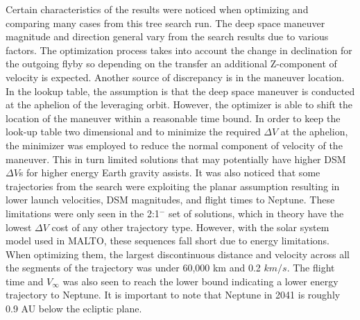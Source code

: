 \documentclass[letterpaper, paper,11pt]{./AAS}		%
\begin{document}
Certain characteristics of the results were noticed when optimizing and comparing many cases from this tree search run. The deep space maneuver magnitude and direction general vary from the search results due to various factors. The optimization process takes into account the change in declination for the outgoing flyby so depending on the transfer an additional Z-component of velocity is expected. Another source of discrepancy is in the maneuver location. In the lookup table, the assumption is that the deep space maneuver is conducted at the aphelion of the leveraging orbit. However, the optimizer is able to shift the location of the maneuver within a reasonable time bound. In order to keep the look-up table two dimensional and to minimize the required $\Delta V$ at the aphelion, the minimizer was employed to reduce the normal component of velocity of the maneuver. This in turn limited solutions that may potentially have higher DSM $\Delta V$s for higher energy Earth gravity assists. It was also noticed that some trajectories from the search were exploiting the planar assumption resulting in lower launch velocities, DSM magnitudes, and flight times to Neptune. These limitations were only seen in the 2:1$^{-}$ set of solutions, which in theory have the lowest $\Delta V$ cost of any other trajectory type. However, with the solar system model used in MALTO, these sequences fall short due to energy limitations. When optimizing them, the largest discontinuous distance and velocity across all the segments of the trajectory was under 60,000 km and 0.2 $km/s$. The flight time and $V_\infty$ was also seen to reach the lower bound indicating a lower energy trajectory to Neptune. It is important to note that Neptune in 2041 is roughly 0.9 AU below the ecliptic plane. 
\end{document}
